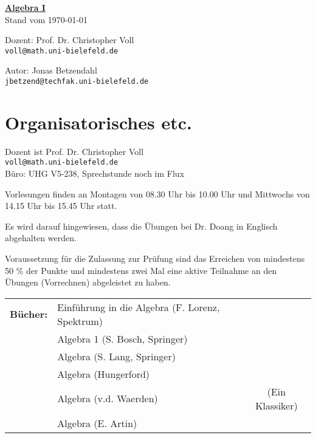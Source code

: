 \documentclass[10pt,a4paper]{article}
\author{Jonas Betzendahl}
\date{\today}
\begin{document}
\newcommand{\menge}[2]{$\{\,{#1}\,\vert\,{#2}\,\}$}
\parindent0pt

\begin{center}

\Huge \textbf{\underline{Algebra I}} \\\bigskip
\normalsize\normalsize Stand vom \today\\

\begin{multicols}{2}
Dozent: Prof. Dr. Christopher Voll\\
\texttt{voll@math.uni-bielefeld.de   }\bigskip

Autor: Jonas Betzendahl\\
\texttt{jbetzend@techfak.uni-bielefeld.de}\bigskip
\end{multicols}
\end{center}

\tableofcontents
\newpage

\setcounter{section}{-2} %

\section{Organisatorisches etc.}

Dozent ist Prof. Dr. Christopher Voll\\
\texttt{voll@math.uni-bielefeld.de}\\
Büro: UHG V5-238, Sprechstunde noch im Flux\bigskip

Vorlesungen finden an Montagen von 08.30 Uhr bis 10.00 Uhr und Mittwochs von 14.15 Uhr bis 15.45 Uhr statt.\bigskip

Es wird darauf hingewiesen, dass die Übungen bei Dr. Doang in Englisch abgehalten werden.\bigskip

Voraussetzung für die Zulassung zur Prüfung sind das Erreichen von mindestens 50 \% der Punkte und mindestens zwei Mal eine aktive Teilnahme an den Übungen (Vorrechnen) abgeleistet zu haben.\bigskip

\begin{tabular}{rlc}
\textbf{Bücher:} & Einführung in die Algebra (F. Lorenz, Spektrum)&\\
        & Algebra 1 (S. Bosch, Springer)&\\
        & Algebra (S. Lang, Springer)&\\
        & Algebra (Hungerford)&\\
        & Algebra (v.d. Waerden) & (Ein Klassiker)\\
        & Algebra (E. Artin) &
\end{tabular}\bigskip
\end{document}
